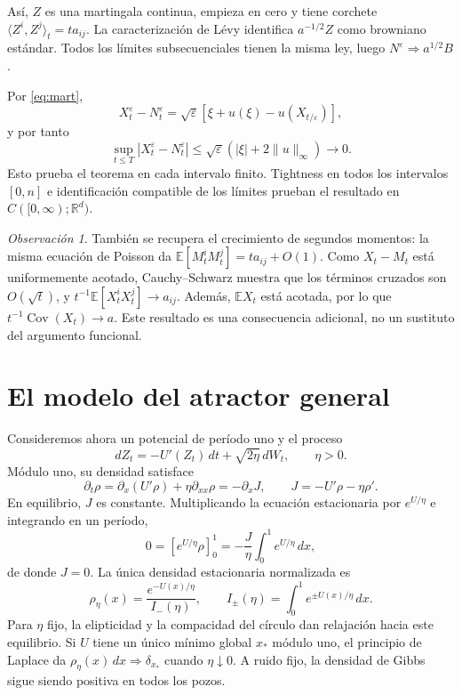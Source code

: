 \documentclass[11pt,a4paper]{article}
\theoremstyle{remark}\newtheorem{remark}{Observación}
\newcommand{\R}{\mathbb R}
\newcommand{\E}{\mathbb E}
\DeclareMathOperator{\Cov}{Cov}
\begin{document}
Así, $Z$ es una martingala continua, empieza en cero y tiene corchete $\langle Z^i,Z^j\rangle_t=ta_{ij}$. La caracterización de Lévy identifica $a^{-1/2}Z$ como browniano estándar. Todos los límites subsecuenciales tienen la misma ley, luego $N^\varepsilon\Rightarrow a^{1/2}B$.

Por \eqref{eq:mart},
\[
 X_t^\varepsilon-N_t^\varepsilon
 =\sqrt\varepsilon[\xi+u(\xi)-u(X_{t/\varepsilon})],
\]
y por tanto
\[
 \sup_{t\leq T}|X_t^\varepsilon-N_t^\varepsilon|
 \leq\sqrt\varepsilon(|\xi|+2\|u\|_\infty)\longrightarrow0.
\]
Esto prueba el teorema en cada intervalo finito. Tightness en todos los intervalos $[0,n]$ e identificación compatible de los límites prueban el resultado en $C([0,\infty);\R^d)$.

\begin{remark}
También se recupera el crecimiento de segundos momentos: la misma ecuación de Poisson da $\E[M_t^iM_t^j]=ta_{ij}+O(1)$. Como $X_t-M_t$ está uniformemente acotado, Cauchy--Schwarz muestra que los términos cruzados son $O(\sqrt t)$, y $t^{-1}\E[X_t^iX_t^j]\to a_{ij}$. Además, $\E X_t$ está acotada, por lo que $t^{-1}\Cov(X_t)\to a$. Este resultado es una consecuencia adicional, no un sustituto del argumento funcional.
\end{remark}

\section{El modelo del atractor general}
Consideremos ahora un potencial de período uno y el proceso
\begin{equation}\label{eq:gradient}
 dZ_t=-U'(Z_t)\,dt+\sqrt{2\eta}\,dW_t,\qquad\eta>0.
\end{equation}
Módulo uno, su densidad satisface
\[
 \partial_t\rho=\partial_x(U'\rho)+\eta\partial_{xx}\rho
 =-\partial_xJ,\qquad J=-U'\rho-\eta\rho'.
\]
En equilibrio, $J$ es constante. Multiplicando la ecuación estacionaria por $e^{U/\eta}$ e integrando en un período,
\[
 0=[e^{U/\eta}\rho]_0^1
 =-\frac{J}{\eta}\int_0^1e^{U/\eta}\,dx,
\]
de donde $J=0$. La única densidad estacionaria normalizada es
\begin{equation}\label{eq:gibbs}
 \rho_\eta(x)=\frac{e^{-U(x)/\eta}}{I_-(\eta)},
 \qquad I_\pm(\eta)=\int_0^1e^{\pm U(x)/\eta}\,dx.
\end{equation}
Para $\eta$ fijo, la elipticidad y la compacidad del círculo dan relajación hacia este equilibrio. Si $U$ tiene un único mínimo global $x_*$ módulo uno, el principio de Laplace da $\rho_\eta(x)\,dx\Rightarrow\delta_{x_*}$ cuando $\eta\downarrow0$. A ruido fijo, la densidad de Gibbs sigue siendo positiva en todos los pozos.
\end{document}
